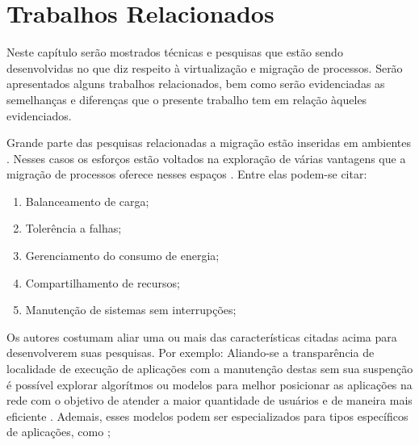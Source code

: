 \glsresetall
\chapter{Trabalhos Relacionados}\label{chap.related-work}

Neste capítulo serão mostrados técnicas e pesquisas que estão sendo desenvolvidas no que diz respeito à virtualização e migração de processos. Serão apresentados alguns trabalhos relacionados, bem como serão evidenciadas as semelhanças e diferenças que o presente trabalho tem em relação àqueles evidenciados.

Grande parte das pesquisas relacionadas a migração estão inseridas em ambientes \cloud. Nesses casos os esforços estão voltados na exploração de várias vantagens que a migração de processos oferece nesses espaços \cite{live-vm-migration-techniques}. Entre elas podem-se citar:
\begin{enumerate}[label=(\roman*)]
    \item Balanceamento de carga;
    \item Tolerência a falhas;
    \item Gerenciamento do consumo de energia;
    \item Compartilhamento de recursos;
    \item Manutenção de sistemas sem interrupções;
\end{enumerate}

Os autores costumam aliar uma ou mais das características citadas acima para desenvolverem suas pesquisas. Por exemplo:
    Aliando-se a transparência de localidade de execução de aplicações com a manutenção destas sem sua suspenção é possível explorar algorítmos ou modelos para melhor posicionar as aplicações na rede com o objetivo de atender a maior quantidade de usuários e de maneira mais eficiente \cite{live-migration-sdn}. Ademais, esses modelos podem ser especializados para tipos específicos de aplicações, como \iot \cite{ada-things};
